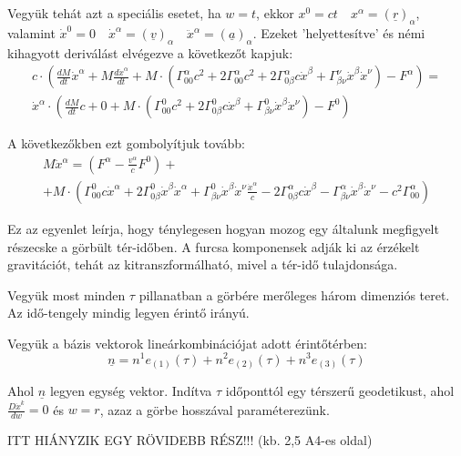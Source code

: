 \documentclass[a4paper,12pt]{article}
\begin{document}
\par Vegyük tehát azt a speciális esetet, ha $w = t$, ekkor $x^{0} = ct \quad x^{\alpha} = (\underline{r})_{\alpha}$, valamint $\dot{x}^{0} = 0 \quad \dot{x}^{\alpha} = (\underline{v})_{\alpha} \quad \ddot{x}^{\alpha} = (\underline{a})_{\alpha}$. Ezeket 'helyettesítve' és némi kihagyott deriválást elvégezve a következőt kapjuk:
\begin{align*}
    c\cdot(\frac{dM}{dt}\dot{x}^{\alpha} + M\frac{d\dot{x}^{\alpha}}{dt} + M\cdot(\Gamma_{00}^{\alpha}c^{2} + 2\Gamma_{00}^{\alpha}c^{2} + 2\Gamma_{0\beta}^{\alpha}c\dot{x}^{\beta} + \Gamma_{\beta\nu}^{\nu}\dot{x}^{\beta}\dot{x}^{\nu}) - F^{\alpha}) = \\
    \dot{x}^{\alpha}\cdot(\frac{dM}{dt}c + 0 + M\cdot(\Gamma_{00}^{0}c^{2} + 2\Gamma_{0\beta}^{0}c\dot{x}^{\beta} + \Gamma_{\beta\nu}^{0}\dot{x}^{\beta}\dot{x}^{\nu}) - F^{0})
\end{align*}
\par A következőkben ezt gombolyítjuk tovább:
\begin{align*}
    M\ddot{x}^{\alpha} = (F^{\alpha} - \frac{v^{\alpha}}{c}F^{0}) + \\
    + M\cdot(\Gamma_{00}^{0}c\dot{x}^{\alpha} + 2\Gamma_{0\beta}^{0}\dot{x}^{\beta}\dot{x}^{\alpha} + \Gamma_{\beta\nu}^{0}\dot{x}^{\beta}\dot{x}^{\nu}\frac{\dot{x}^{\alpha}}{c} - 2\Gamma_{0\beta}^{\alpha}c\dot{x}^{\beta} - \Gamma_{\beta\nu}^{\alpha}\dot{x}^{\beta}\dot{x}^{\nu} - c^{2}\Gamma_{00}^{\alpha})
\end{align*}
\par Ez az egyenlet leírja, hogy ténylegesen hogyan mozog egy általunk megfigyelt részecske a görbült tér-időben. A furcsa komponensek adják ki az érzékelt gravitációt, tehát az kitranszformálható, mivel a tér-idő tulajdonsága.
\par Vegyük most minden $\tau$ pillanatban a görbére merőleges három dimenziós teret. Az idő-tengely mindig legyen érintő irányú.
\par Vegyük a bázis vektorok lineárkombinációjat adott érintőtérben:
\begin{equation*}
    \underline{n} = n^{1}e_{(1)}(\tau) + n^{2}e_{(2)}(\tau) + n^{3}e_{(3)}(\tau)
\end{equation*}
\par Ahol $\underline{n}$ legyen egység vektor. Indítva $\tau$ időponttól egy térszerű geodetikust, ahol $\frac{D\dot{x}^{k}}{dw} = 0$ és $w = r$, azaz a görbe hosszával paraméterezünk. 
\par ITT HIÁNYZIK EGY RÖVIDEBB RÉSZ!!! (kb. 2,5 A4-es oldal)
\end{document}
